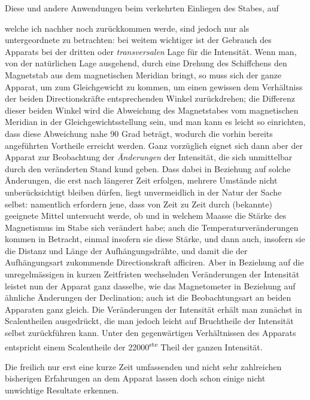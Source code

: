Diese und andere Anwendungen beim verkehrten Einliegen des Stabes, auf
\par\GaussVSourceGathering{46\textsuperscript{*}}
\par\clearpage
{}
\noindent welche ich nachher noch zurückkommen werde, sind jedoch nur als untergeordnete zu betrachten: bei weitem wichtiger ist der Gebrauch des Apparats bei der dritten oder \textit{transversalen} Lage für die Intensität. Wenn man, von der natürlichen Lage ausgehend, durch eine Drehung des Schiffchens den Magnetstab aus dem magnetischen Meridian bringt, so muss sich der ganze Apparat, um zum Gleichgewicht zu kommen, um einen gewissen dem Verhältniss der beiden Directionskräfte entsprechenden Winkel zurückdrehen; die Differenz dieser beiden Winkel wird die Abweichung des Magnetstabes vom magnetischen Meridian in der Gleichgewichtsstellung sein, und man kann es leicht so einrichten, dass diese Abweichung nahe 90 Grad beträgt, wodurch die vorhin bereits angeführten Vortheile erreicht werden. Ganz vorzüglich eignet sich dann aber der Apparat zur Beobachtung der \textit{Änderungen} der Intensität, die sich unmittelbar durch den veränderten Stand kund geben. Dass dabei in Beziehung auf solche Änderungen, die erst nach längerer Zeit erfolgen, mehrere Umstände nicht unberücksichtigt bleiben dürfen, liegt unvermeidlich in der Natur der Sache selbst: namentlich erfordern jene, dass von Zeit zu Zeit durch (bekannte) geeignete Mittel untersucht werde, ob und in welchem Maasse die Stärke des Magnetismus im Stabe sich verändert habe; auch die Temperaturveränderungen kommen in Betracht, einmal insofern sie diese Stärke, und dann auch, insofern sie die Distanz und Länge der Aufhängungsdrähte, und damit die der Aufhängungsart zukommende Directionskraft afficiren. Aber in Beziehung auf die unregelmässigen in kurzen Zeitfristen wechselnden Veränderungen der Intensität leistet nun der Apparat ganz dasselbe, wie das Magnetometer in Beziehung auf ähnliche Änderungen der Declination; auch ist die Beobachtungsart an beiden Apparaten ganz gleich. Die Veränderungen der Intensität erhält man zunächst in Scalentheilen ausgedrückt, die man jedoch leicht auf Bruchtheile der Intensität selbst zurückführen kann. Unter den gegenwärtigen Verhältnissen des Apparats entspricht einem Scalentheile der 22000\textsuperscript{ste} Theil der ganzen Intensität.

Die freilich nur erst eine kurze Zeit umfassenden und nicht sehr zahlreichen bisherigen Erfahrungen an dem Apparat lassen doch schon einige nicht unwichtige Resultate erkennen.

